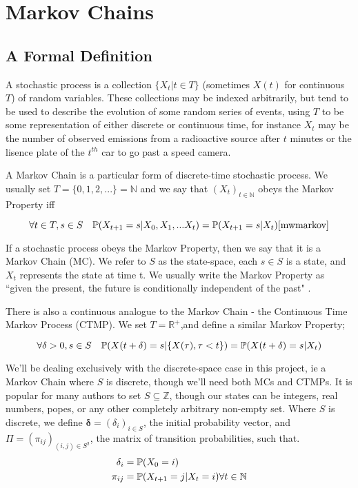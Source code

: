 \section{Markov Chains}

\subsection{A Formal Definition}

A stochastic process \cite[p590]{doob96} is a collection $\{X_t  | t \in T\}$ (sometimes $X(t)$ for continuous $T$) of random variables. These collections may be indexed arbitrarily, but tend to be used to describe the evolution of some random series of events, using $T$ to be some representation of either discrete or continuous time, for instance $X_t$ may be the number of observed emissions from a radioactive source after $t$ minutes or the lisence plate of the $t^{th}$ car to go past a speed camera.

A Markov Chain is a particular form of discrete-time stochastic process. We usually set $T=\{0,1,2,...\}=\mathbb{N}$ and we say that $(X_t)_{t \in \mathbb{N}}$ obeys the Markov Property iff

$$
\forall t \in T, s \in S \quad \mathbb{P} (X_{t+1} = s | X_0, X_1, ... X_t) = \mathbb{P} (X_{t+1} = s | X_t)\cite{mwmarkov}
$$

If a stochastic process obeys the Markov Property, then we say that it is a Markov Chain (MC). We refer to $S$ as the state-space, each $s \in S$ is a state, and $X_t$ represents the state at time t. We usually write the Markov Property as ``given the present, the future is conditionally independent of the past" \cite{mwmarkov}.

There is also a continuous analogue to the Markov Chain - the Continuous Time Markov Process (CTMP). We set $T=\mathbb{R}^{+}$,and define a similar Markov Property;

$$
\forall \delta > 0, s \in S \quad \mathbb{P} (X(t+\delta) = s | \{X(\tau), \tau < t\}) = \mathbb{P} (X(t+\delta) = s | X_t)
$$

We'll be dealing exclusively with the discrete-space case in this project, ie a Markov Chain where $S$ is discrete, though we'll need both MCs and CTMPs. It is popular for many authors to set $S \subseteq \mathbb{Z}$, though our states can be integers, real numbers, popes, or any other completely arbitrary non-empty set. Where $S$ is discrete, we define $\mathbf{\delta} = (\delta_i)_{i \in S}$, the initial probability vector, and $\Pi = (\pi_{ij})_{(i,j) \in S^2}$, the matrix of transition probabilities, such that.
\begin{align*}
\delta_i &= \mathbb{P} (X_0 = i) \\
\pi_{ij} &= \mathbb{P}(X_{t+1} = j | X_t = i) \forall t \in \mathbb{N}
\end{align*}

